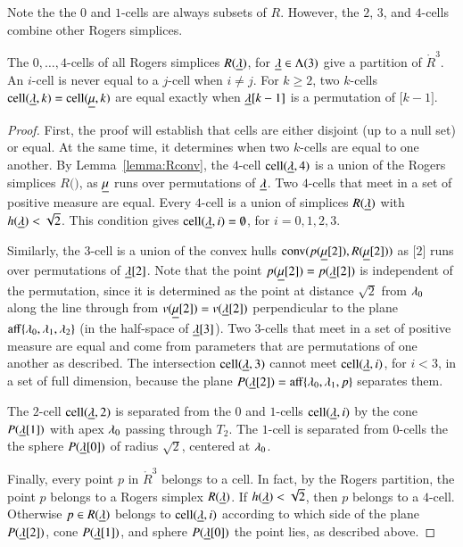 Note the the $0$ and $1$-cells are always subsets of $R$.  However, the $2$, $3$, and
$4$-cells combine other Rogers simplices.

\begin{lemma}  The $0,\ldots,4$-cells of all Rogers simplices $R({\underline{\lambda}})$, for ${\underline{\lambda}}\in \Lambda(3)$
give a partition of $\ring{R}^3$.  An $i$-cell is never equal to a $j$-cell when $i\ne j$. For $k\ge 2$, 
two $k$-cells $\operatorname{cell}({\underline{\lambda}},k)=\operatorname{cell}({\underline{\mu}},k)$ are equal exactly when ${\underline{\lambda}}[k-1]$
is a permutation of $\bm[k-1]$.
\end{lemma}

\begin{proof}  First, the proof will establish that cells are either disjoint (up to a null set) or equal.  At the same time, it determines when two $k$-cells are equal to one another. By Lemma~\ref{lemma:Rconv}, the $4$-cell $\operatorname{cell}({\underline{\lambda}},4)$ is a union of the Rogers simplices $R(\bm)$, as ${\underline{\mu}}$ runs over permutations of ${\underline{\lambda}}$.   Two $4$-cells that meet in a set of positive measure are equal.  Every $4$-cell is a union of simplices $R({\underline{\lambda}})$ with $h({\underline{\lambda}})<\sqrt2$.  This condition gives $\operatorname{cell}({\underline{\lambda}},i)=\emptyset$, for $i=0,1,2,3$.

Similarly, the $3$-cell is a union
of the convex hulls ${\operatorname{conv}}(p({\underline{\mu}}[2]),R({\underline{\mu}}[2]))$ as $\bm[2]$ runs over permutations of ${\underline{\lambda}}[2]$.  Note that the point $p({\underline{\mu}}[2])=p({\underline{\lambda}}[2])$ is independent of the permutation, since
it is determined as the point at distance $\sqrt2$ from $\lambda_0$ along the line through
from $v({\underline{\mu}}[2])=v({\underline{\lambda}}[2])$ perpendicular to the plane ${\operatorname{aff}}\{\lambda_0,\lambda_1,\lambda_2\}$
(in the half-space of ${\underline{\lambda}}[3]$). Two $3$-cells that meet in a set of positive measure are equal and come from parameters that are permutations of  one another as described.   The intersection $\operatorname{cell}({\underline{\lambda}},3)$ cannot meet $\operatorname{cell}({\underline{\lambda}},i)$, for $i<3$, in a set of full dimension, because the plane $P({\underline{\lambda}}[2])={\operatorname{aff}}\{\lambda_0,\lambda_1,p\}$ separates them.

The $2$-cell $\operatorname{cell}({\underline{\lambda}},2)$ is separated from the $0$ and $1$-cells $\operatorname{cell}({\underline{\lambda}},i)$
by the cone $P({\underline{\lambda}}[1])$ with apex $\lambda_0$
passing through $T_2$. The $1$-cell is separated from $0$-cells the the sphere $P({\underline{\lambda}}[0])$
of radius
$\sqrt2$, centered at $\lambda_0$.

Finally,  every point $p$ in $\ring{R}^3$ belongs to a cell.  In fact, by the Rogers
partition, the point $p$ belongs to a Rogers simplex $R({\underline{\lambda}})$.  If $h({\underline{\lambda}})<\sqrt2$, then
$p$ belongs to a $4$-cell.  Otherwise $p\in R({\underline{\lambda}})$ belongs to $\operatorname{cell}({\underline{\lambda}},i)$ according to
which side of the plane $P({\underline{\lambda}}[2])$, cone $P({\underline{\lambda}}[1])$, and sphere $P({\underline{\lambda}}[0])$ the point
lies, as described above.
\end{proof}


